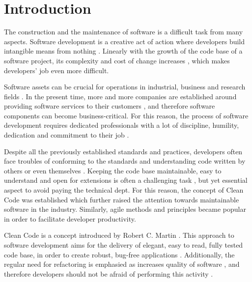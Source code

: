 \documentclass[conference]{IEEEtran}
\begin{document}

\section{Introduction}
The construction and the maintenance of software is a difficult task from many aspects. Software development is a creative act of action where developers build intangible means from nothing \cite{cleancoder}. Linearly with the growth of the code base of a software project, its complexity and cost of change increases \cite{codecomplete} \cite{cleancode}, which makes developers' job even more difficult. 

Software assets can be crucial for operations in industrial, business and research fields \cite{cleancode} \cite{cleancoder}. In the present time, more and more companies are established around providing software services to their customers \cite{cusumano2008changing}, and therefore software components can become business-critical. For this reason, the process of software development requires dedicated professionals with a lot of discipline, humility, dedication and commitment to their job \cite{cleancode}. 

Despite all the previously established standards and practices, developers often face troubles of conforming to the standards and understanding code written by others or even themselves \cite{cleancoder}. Keeping the code base maintainable, easy to understand and open for extensions is often a challenging task \cite{cleancoder}, but yet essential aspect to avoid paying the technical dept. For this reason, the concept of Clean Code \cite{cleancode} was established which further raised the attention towards maintainable software in the industry. Similarly, agile methods and principles became popular in order to facilitate developer productivity. 

Clean Code is a concept introduced by Robert C. Martin \cite{cleancode} \cite{cleancoder}. This approach to software development aims for the delivery of elegant, easy to read, fully tested code base, in order to create robust, bug-free applications \cite{cleancode}. Additionally, the regular need for refactoring is emphasied as increases quality of software \cite{impactofrefactoring}, and therefore developers should not be afraid of performing this activity \cite{cleancoder}. 
\end{document}

